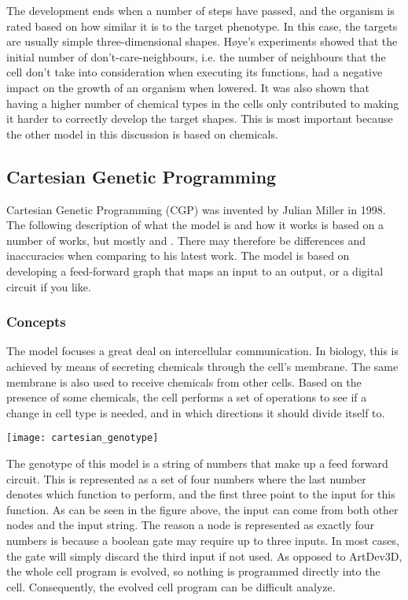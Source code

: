 The development ends when a number of steps have passed, and the organism is rated based on how similar it is to the target phenotype. In this case, the targets are usually simple three-dimensional shapes. H{\o}ye's experiments showed that the initial number of don't-care-neighbours, i.e. the number of neighbours that the cell don't take into consideration when executing its functions, had a negative impact on the growth of an organism when lowered. It was also shown that having a higher number of chemical types in the cells only contributed to making it harder to correctly develop the target shapes. This is most important because the other model in this discussion is based on chemicals.


\subsection{Cartesian Genetic Programming}
Cartesian Genetic Programming (CGP) was invented by Julian Miller in 1998. The following description of what the model is and how it works is based on a number of works, but mostly \cite{mteurogp2000} and \cite{ecal2003}. There may therefore be differences and inaccuracies when comparing to his latest work. The model is based on developing a feed-forward graph that maps an input to an output, or a digital circuit if you like.

\subsubsection{Concepts}
The model focuses a great deal on intercellular communication. In biology, this is achieved by means of secreting chemicals through the cell's membrane. The same membrane is also used to receive chemicals from other cells. Based on the presence of some chemicals, the cell performs a set of operations to see if a change in cell type is needed, and in which directions it should divide itself to.

\begin{center}\texttt{[image: cartesian\_genotype]}\end{center}

The genotype of this model is a string of numbers that make up a feed forward circuit. This is represented as a set of four numbers where the last number denotes which function to perform, and the first three point to the input for this function. As can be seen in the figure above, the input can come from both other nodes and the input string. The reason a node is represented as exactly four numbers is because a boolean gate may require up to three inputs. In most cases, the gate will simply discard the third input if not used. As opposed to ArtDev3D, the whole cell program is evolved, so nothing is programmed directly into the cell. Consequently, the evolved cell program can be difficult analyze.

